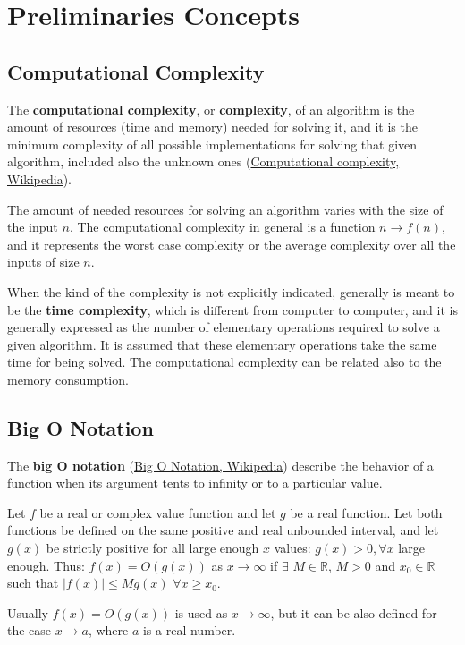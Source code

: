\chapter{Preliminaries Concepts}
\label{preliminariesconcepts}

\section{Computational Complexity}
The \textbf{computational complexity}, or \textbf{complexity}, of an algorithm is the amount of resources (time and memory) needed for solving it, and it is the minimum complexity of all possible implementations for solving that given algorithm, included also the unknown ones \cite{wikipediacomplexity} (\href{https://en.wikipedia.org/wiki/Computational_complexity}{Computational complexity, Wikipedia}).

The amount of needed resources for solving an algorithm varies with the size of the input \(n\). The computational complexity in general is a function \(n \rightarrow f(n)\), and it represents the worst case complexity or the average complexity over all the inputs of size \(n\).

When the kind of the complexity is not explicitly indicated, generally is meant to be the \textbf{time complexity}, which is different from computer to computer, and it is generally expressed as the number of elementary operations required to solve a given algorithm. It is assumed that these elementary operations take the same time for being solved. The computational complexity can be related also to the memory consumption.

\section{Big O Notation}
The \textbf{big O notation} \cite{wikipediabigo} (\href{https://en.wikipedia.org/wiki/Big_O_notation}{Big O Notation, Wikipedia}) describe the behavior of a function when its argument tents to infinity or to a particular value.

\begin{definition}
Let \(f\) be a real or complex value function and let \(g\) be a real function. Let both functions be defined on the same positive and real unbounded interval, and let \(g(x)\) be strictly positive for all large enough \(x\) values: \(g(x) > 0, \forall x\) large enough. Thus: \(f(x)=O(g(x)) \) as \(x \rightarrow \infty \) if \(\exists\) \(M \in \mathbb{R} \), \(M>0\) and \(x_{0} \in \mathbb{R} \) such that \(|f(x)| \leq Mg(x)\) \(\forall x \geq x_{0}\). 
\end{definition}
Usually \(f(x)=O(g(x))\) is used as \(x \rightarrow \infty\), but it can be also defined for the case \(x \rightarrow a\), where \(a\) is a real number.

